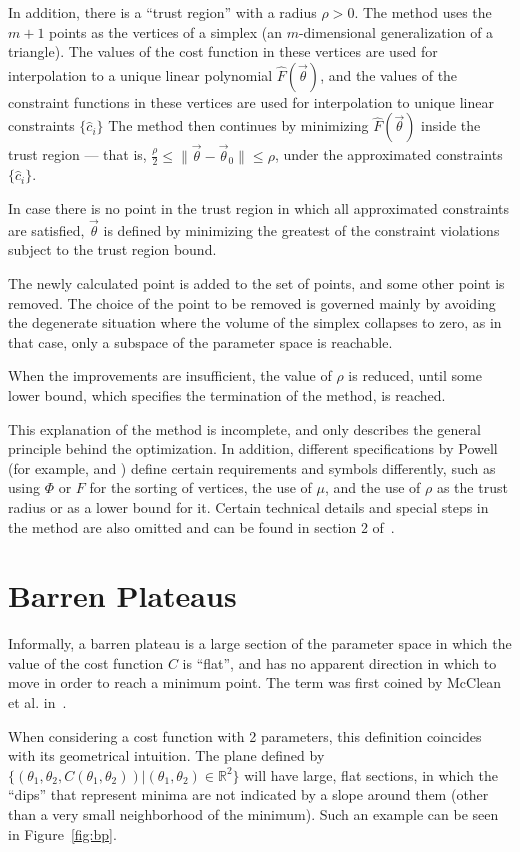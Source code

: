 \documentclass[a4paper,12pt]{article}
\newcommand{\thetas}{\vec{\theta}}
\begin{document}
In addition, there is a ``trust region'' with a radius $\rho>0$. The method uses the $m+1$ points as the vertices of a simplex (an $m$-dimensional generalization of a triangle).
The values of the cost function in these vertices are used for interpolation to a unique linear polynomial $\hat{F}(\thetas)$, and the values of the constraint functions in these vertices are used for interpolation to unique linear constraints $\{\hat{c}_i\}$
The method then continues by minimizing $\hat{F}(\thetas)$ inside the trust region --- that is, $\frac{\rho}{2} \leq \|\thetas - \thetas_0\| \leq \rho$, under the approximated constraints $\{\hat{c}_i\}$.

In case there is no point in the trust region in which all approximated constraints are satisfied, $\thetas$ is defined by minimizing the greatest of the constraint violations subject to the trust region bound.

The newly calculated point is added to the set of points, and some other point is removed.
The choice of the point to be removed is governed mainly by avoiding the degenerate situation where the volume of the simplex collapses to zero, as in that case, only a subspace of the parameter space is reachable.

When the improvements are insufficient, the value of $\rho$ is reduced, until some lower bound, which specifies the termination of the method, is reached.

This explanation of the method is incomplete, and only describes the general principle behind the optimization. In addition, different specifications by Powell (for example, \cite{Powell1994} and \cite{powell_view_2007}) define certain requirements and symbols differently, such as using $\Phi$ or $F$ for the sorting of vertices, the use of $\mu$, and the use of $\rho$ as the trust radius or as a lower bound for it.
Certain technical details and special steps in the method are also omitted and can be found in section 2 of~\cite{Powell1994}.


\section{Barren Plateaus} \label{sec:bps}
Informally, a barren plateau is a large section of the parameter space in which the value of the cost function $C$ is ``flat'', and has no apparent direction in which to move in order to reach a minimum point. The term was first coined by McClean et al. in~\cite{mcclean_barren_2018}.

When considering a cost function with 2 parameters, this definition coincides with its geometrical intuition. The plane defined by $\{(\theta_1, \theta_2, C(\theta_1, \theta_2)) | (\theta_1, \theta_2) \in \mathbb{R}^2\}$ will have large, flat sections, in which the ``dips'' that represent minima are not indicated by a slope around them (other than a very small neighborhood of the minimum). Such an example can be seen in Figure~\ref{fig:bp}.
\end{document}

